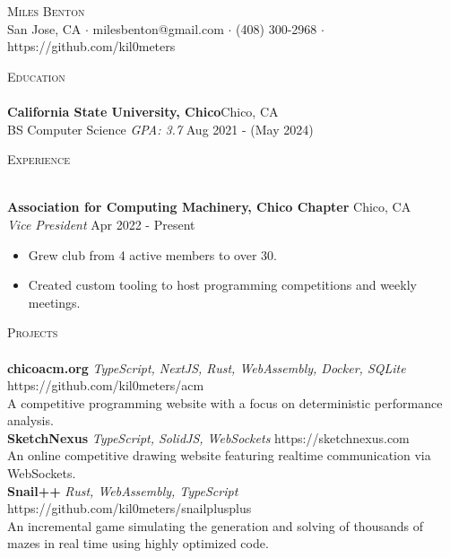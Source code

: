\documentclass[a4paper]{article}
\newcommand{\lineunder} {
    \vspace*{-8pt} \\
    \hspace*{-18pt} \hrulefill \\
}
\newcommand{\header} [1] {
    {\hspace*{-18pt}\vspace*{6pt} \textsc{#1}}
    \vspace*{-6pt} \lineunder
}
\begin{document}
\vspace*{-40pt}

    

\vspace*{-10pt}
\begin{center}
	{\Huge \scshape {Miles Benton}}\\
	San Jose, CA $\cdot$ milesbenton@gmail.com $\cdot$ (408) 300-2968 $\cdot$ https://github.com/kil0meters\\
\end{center}

\header{Education}
\textbf{California State University, Chico}\hfill Chico, CA\\
BS Computer Science \textit{GPA: 3.7} \hfill Aug 2021 - (May 2024)\\
\vspace{2mm}

\header{Experience}
\vspace{1mm}

\textbf{Association for Computing Machinery, Chico Chapter} \hfill Chico, CA\\
\textit{Vice President} \hfill Apr 2022 - Present\\
\vspace{-1mm}
\begin{itemize} \itemsep 1pt
	\item Grew club from 4 active members to over 30.
	\item Created custom tooling to host programming competitions and weekly meetings.
\end{itemize}

\header{Projects}
{\textbf{chicoacm.org}} {\sl TypeScript, NextJS, Rust, WebAssembly, Docker, SQLite} \hfill https://github.com/kil0meters/acm\\
A competitive programming website with a focus on deterministic performance analysis.\\
\vspace*{2mm}
{\textbf{SketchNexus}} {\sl TypeScript, SolidJS, WebSockets} \hfill https://sketchnexus.com\\
An online competitive drawing website featuring realtime communication via WebSockets.\\
\vspace*{2mm}
{\textbf{Snail++}} {\sl Rust, WebAssembly, TypeScript} \hfill https://github.com/kil0meters/snailplusplus\\
An incremental game simulating the generation and solving of thousands of mazes in real time using highly optimized code.\\
\vspace*{2mm}
\end{document}
